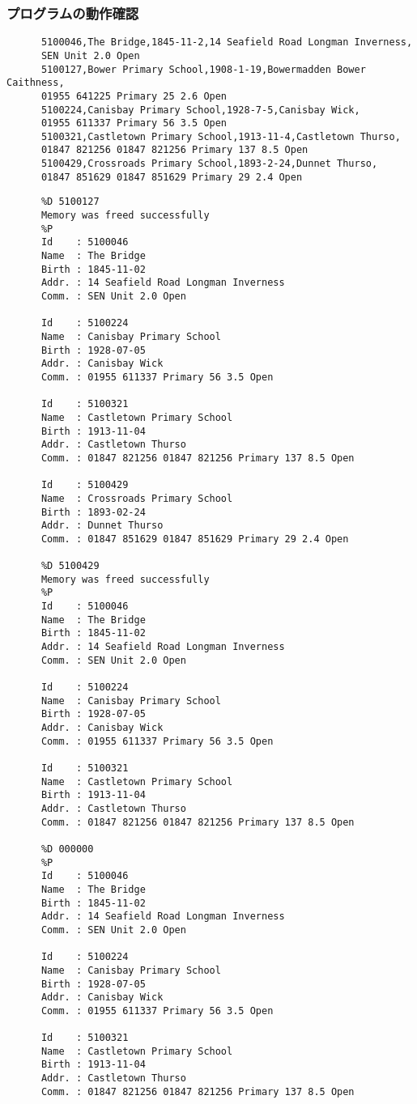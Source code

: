     \subsubsection{プログラムの動作確認}
    
    \begin{verbatim}
      5100046,The Bridge,1845-11-2,14 Seafield Road Longman Inverness,
      SEN Unit 2.0 Open
      5100127,Bower Primary School,1908-1-19,Bowermadden Bower Caithness,
      01955 641225 Primary 25 2.6 Open
      5100224,Canisbay Primary School,1928-7-5,Canisbay Wick,
      01955 611337 Primary 56 3.5 Open
      5100321,Castletown Primary School,1913-11-4,Castletown Thurso,
      01847 821256 01847 821256 Primary 137 8.5 Open
      5100429,Crossroads Primary School,1893-2-24,Dunnet Thurso,
      01847 851629 01847 851629 Primary 29 2.4 Open
    \end{verbatim}
    \begin{verbatim}
      %D 5100127
      Memory was freed successfully
      %P
      Id    : 5100046
      Name  : The Bridge
      Birth : 1845-11-02
      Addr. : 14 Seafield Road Longman Inverness
      Comm. : SEN Unit 2.0 Open

      Id    : 5100224
      Name  : Canisbay Primary School
      Birth : 1928-07-05
      Addr. : Canisbay Wick
      Comm. : 01955 611337 Primary 56 3.5 Open

      Id    : 5100321
      Name  : Castletown Primary School
      Birth : 1913-11-04
      Addr. : Castletown Thurso
      Comm. : 01847 821256 01847 821256 Primary 137 8.5 Open

      Id    : 5100429
      Name  : Crossroads Primary School
      Birth : 1893-02-24
      Addr. : Dunnet Thurso
      Comm. : 01847 851629 01847 851629 Primary 29 2.4 Open

      %D 5100429
      Memory was freed successfully
      %P
      Id    : 5100046
      Name  : The Bridge
      Birth : 1845-11-02
      Addr. : 14 Seafield Road Longman Inverness
      Comm. : SEN Unit 2.0 Open

      Id    : 5100224
      Name  : Canisbay Primary School
      Birth : 1928-07-05
      Addr. : Canisbay Wick
      Comm. : 01955 611337 Primary 56 3.5 Open

      Id    : 5100321
      Name  : Castletown Primary School
      Birth : 1913-11-04
      Addr. : Castletown Thurso
      Comm. : 01847 821256 01847 821256 Primary 137 8.5 Open

      %D 000000
      %P
      Id    : 5100046
      Name  : The Bridge
      Birth : 1845-11-02
      Addr. : 14 Seafield Road Longman Inverness
      Comm. : SEN Unit 2.0 Open

      Id    : 5100224
      Name  : Canisbay Primary School
      Birth : 1928-07-05
      Addr. : Canisbay Wick
      Comm. : 01955 611337 Primary 56 3.5 Open

      Id    : 5100321
      Name  : Castletown Primary School
      Birth : 1913-11-04
      Addr. : Castletown Thurso
      Comm. : 01847 821256 01847 821256 Primary 137 8.5 Open

    \end{verbatim}
